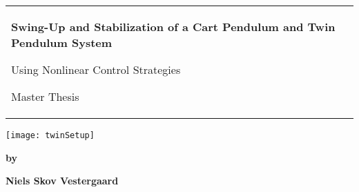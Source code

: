 %
%
 \noindent%
  \vspace{-1.5cm}
  \begin{center}
    \noindent{\color{aaublue}\rule{\textwidth}{.5pt}}
  \end{center}
  \vspace{-.5cm}
  \begin{tabular}{@{}p{\textwidth}@{}}
    \begin{center}
      \Large{\textbf{
        Swing-Up and Stabilization of a Cart Pendulum and Twin Pendulum System
      }}
    \end{center}
    \begin{center}
      \large{
        Using Nonlinear Control Strategies
      }
    \end{center}
    \begin{center}
      \large{
        Master Thesis %
      }
    \end{center}
  \end{tabular}
  \begin{center}
    \texttt{[image: twinSetup]}
  \end{center}
  \vfill
  \begin{center}
    \textbf{by}
    
    \textbf{Niels Skov Vestergaard}
  \end{center}
\clearpage